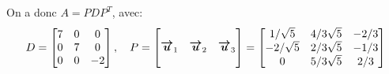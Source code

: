 \documentclass[a4paper]{article}
\begin{document}
{    On a donc $A = PDP^T$, avec: 
    \[D = \begin{bmatrix} 7 & 0 & 0 \\ 0 & 7 & 0 \\ 0 & 0 & -2 \end{bmatrix}, \quad P = \begin{bmatrix}  &  &  \\ \bm{\protect\overrightarrow{u}}_1 & \bm{\protect\overrightarrow{u}}_2 & \bm{\protect\overrightarrow{u}}_3 \\  &  &  \end{bmatrix} = \begin{bmatrix} 1 / \sqrt{5} & 4 / 3\sqrt{5} & -2 / 3 \\ -2 / \sqrt{5} & 2 / 3\sqrt{5} & -1 / 3 \\ 0 & 5 / 3\sqrt{5} & 2 / 3 \end{bmatrix} \]
}
\end{document}
